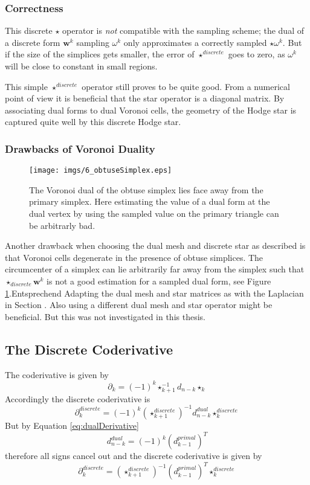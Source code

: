 \subsubsection{Correctness}
This discrete $\star$ operator is \emph{not} compatible with the sampling scheme; the dual of a discrete form $\textbf{w}^k$ sampling $\omega^k$ only approximates a correctly sampled $\star \omega^k$. But if the size of the simplices gets smaller, the error of $\star^{discrete}$ goes to zero, as $\omega^k$ will be close to constant in small regions.

This simple $\star^{discrete}$ operator still proves to be quite good. From a numerical point of view it is beneficial that the star operator is a diagonal matrix. By associating dual forms to dual Voronoi cells, the geometry of the Hodge star is captured quite well by this discrete Hodge star. 

\subsubsection{Drawbacks of Voronoi Duality}

\begin{figure}%
\begin{center}
\texttt{[image: imgs/6\_obtuseSimplex.eps]}%
\end{center}
\caption{The Voronoi dual of the obtuse simplex lies face away from the primary simplex. Here estimating the value of a dual form at the dual vertex by using the sampled value on the primary triangle can be arbitrarly bad.}%
\label{fig:6_obtuse}%
\end{figure}
Another drawback when choosing the dual mesh and discrete star as described is that Voronoi cells degenerate in the presence of obtuse simplices. The circumcenter of a simplex can lie arbitrarily far away from the simplex such that $\star_{discrete}\textbf{w}^k$ is not a good estimation for a sampled dual form, see Figure \ref{fig:6_obtuse}.Entsprechend Adapting the dual mesh and star matrices as with the Laplacian in Section . Also using a different dual mesh and star operator might be beneficial. But this was not investigated in this thesis. 

\subsection{The Discrete Coderivative}
The coderivative is given by
\[\partial_k =(-1)^k\star_{k+1}^{-1}d_{n-k}\star_k\]
Accordingly the discrete coderivative is 
\[\partial_k^{discrete} =(-1)^k(\star_{k+1}^{discrete})^{-1}d_{n-k}^{dual}\star_k^{discrete}\]
But by Equation \ref{eq:dualDerivative} 
$$d_{n-k}^{dual} = (-1)^k(d_{k-1}^{primal})^T$$
therefore all signs cancel out and the discrete coderivative is given by
\begin{equation}
\partial_k^{discrete} =(\star_{k+1}^{discrete})^{-1}(d_{k-1}^{primal})^T\star_k^{discrete}
\label{eq:discreteCoder}
\end{equation}

